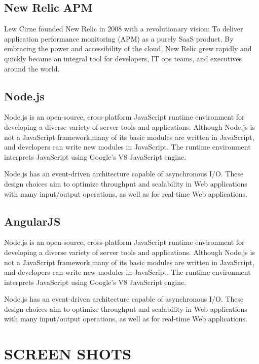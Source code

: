 \documentclass[12pt,a4paper,oneside]{report}
\begin{document}
{\subsection{New Relic APM}
\par
Lew Cirne founded New Relic in 2008 with a revolutionary vision: To deliver application performance monitoring (APM) as a purely SaaS product. By embracing the power and accessibility of the cloud, New Relic grew rapidly and quickly became an integral tool for developers, IT ops teams, and executives around the world.
\pagebreak
\subsection{Node.js}
\par
Node.js is an open-source, cross-platform JavaScript runtime environment for developing a diverse variety of server tools and applications. Although Node.js is not a JavaScript framework,many of its basic modules are written in JavaScript, and developers can write new modules in JavaScript. The runtime environment interprets JavaScript using Google's V8 JavaScript engine.

Node.js has an event-driven architecture capable of asynchronous I/O. These design choices aim to optimize throughput and scalability in Web applications with many input/output operations, as well as for real-time Web applications.
\pagebreak
\subsection{AngularJS}
\par
Node.js is an open-source, cross-platform JavaScript runtime environment for developing a diverse variety of server tools and applications. Although Node.js is not a JavaScript framework,many of its basic modules are written in JavaScript, and developers can write new modules in JavaScript. The runtime environment interprets JavaScript using Google's V8 JavaScript engine.

Node.js has an event-driven architecture capable of asynchronous I/O. These design choices aim to optimize throughput and scalability in Web applications with many input/output operations, as well as for real-time Web applications.
\pagebreak
\section{SCREEN SHOTS}
}
\end{document}
